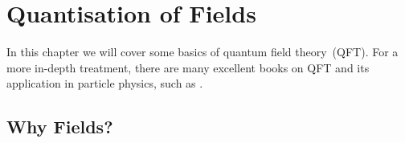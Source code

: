 \documentclass[12pt]{report}
\newcommand{\2}{\ensuremath{\sqrt{2}\,}}
\begin{document}


  \chapter{Quantisation of Fields}
    In this chapter we will cover some basics of quantum field theory~(QFT). For a more in-depth
    treatment, there are many excellent books on QFT and its application in particle physics, such as
    \cite{Nachtmann:1990ta,peskin}.

    \section{Why Fields?}
\end{document}

